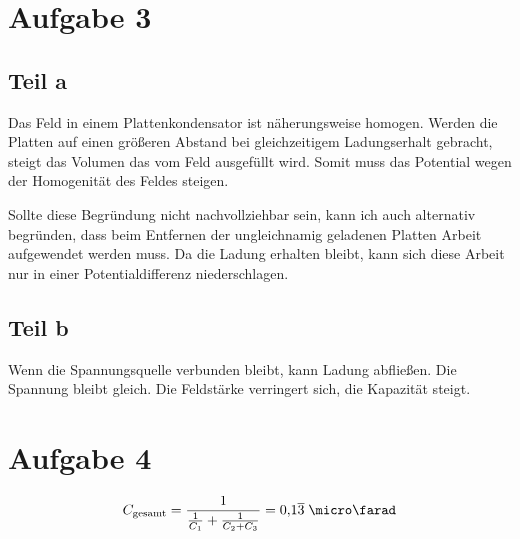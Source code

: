 \documentclass[a4paper,german,12pt,smallheadings]{scrartcl}
\begin{document}
\section*{Aufgabe 3}
\subsection*{Teil a}
Das Feld in einem Plattenkondensator ist näherungsweise homogen. Werden die
Platten auf einen größeren Abstand bei gleichzeitigem Ladungserhalt gebracht,
steigt das Volumen das vom Feld ausgefüllt wird. Somit muss das Potential wegen
der Homogenität des Feldes steigen.

Sollte diese Begründung nicht nachvollziehbar sein, kann ich auch alternativ
begründen, dass beim Entfernen der ungleichnamig geladenen Platten Arbeit
aufgewendet werden muss. Da die Ladung erhalten bleibt, kann sich diese Arbeit
nur in einer Potentialdifferenz niederschlagen.

\subsection*{Teil b}
Wenn die Spannungsquelle verbunden bleibt, kann Ladung abfließen. Die Spannung
bleibt gleich. Die Feldstärke verringert sich, die Kapazität steigt.


\section*{Aufgabe 4}

\begin{align*}
  C_{\operatorname{gesamt}} = \frac{1}{\frac{1}{C_1} + \frac{1}{C_2 + C_3}} = 0{,}1\overline{3} \;\micro\farad
\end{align*}
\end{document}
